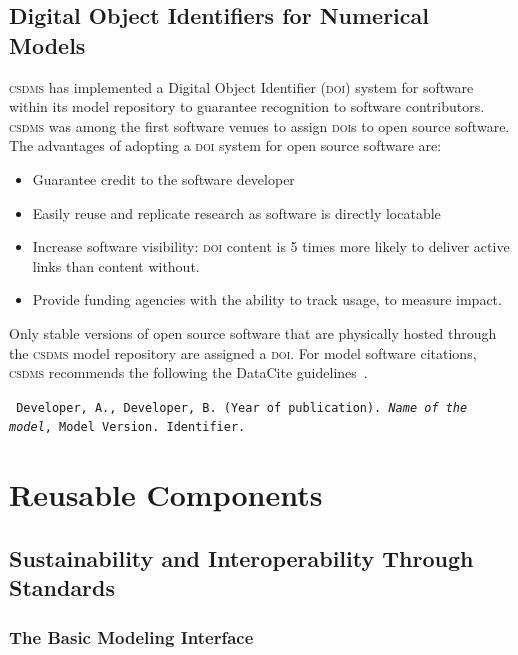 \documentclass[11pt, oneside]{amsart}
\DeclareRobustCommand{\csdms}{\textsc{csdms}}
\DeclareRobustCommand{\doi}{\textsc{doi}}
\begin{document}
\subsection{Digital Object Identifiers for Numerical Models}
\label{sec:doi}

\csdms{} has implemented a
Digital Object Identifier (\doi{}) system for software within its model
repository to guarantee recognition to software contributors.
\csdms{} was among the first software venues to assign \doi{}s to
open source software. The advantages of adopting a \doi{} system for open
source software are: 
\begin{itemize}
\item Guarantee credit to the software developer
\item Easily reuse and replicate research as software is directly locatable 
\item Increase software visibility: \doi{} content is 5 times more likely to
      deliver active links than content without.
\item Provide funding agencies with the ability to track usage, to measure
      impact.
\end{itemize}

Only stable versions of open source
software that are physically hosted through the \csdms{} model repository are
assigned a \doi{}. For model software citations, \csdms{} recommends the
following the DataCite guidelines~\cite{brase2009datacite}.

\begin{shaded}
\leftskip 0.25in
\parindent -0.25in
\tt{
Developer, A., Developer, B. (Year of publication). \emph{Name of the model},
Model Version. Identifier.
}
\end{shaded}

\section{Reusable Components}
\label{sec:reusable}

\subsection{Sustainability and Interoperability Through Standards}
\label{sec:standards}

\subsubsection{The Basic Modeling Interface}
\label{sec:bmi}
\end{document}
